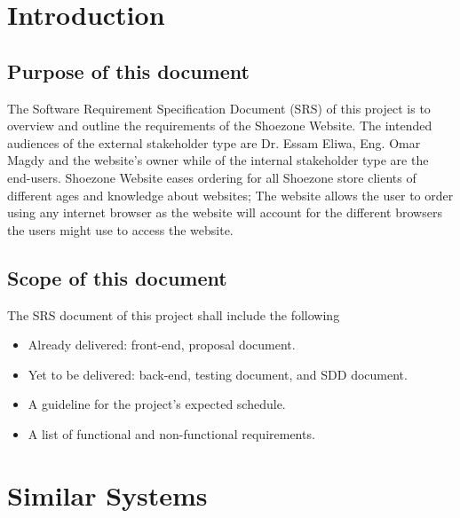 \documentclass[12pt]{article}
\begin{document}
\section{Introduction}
\subsection{Purpose of this document}
The Software Requirement Specification Document (SRS) of this project is to overview and outline the requirements of the Shoezone Website. The intended audiences of the external stakeholder type are Dr. Essam Eliwa, Eng. Omar Magdy and the website's owner while of the internal stakeholder type are the end-users. Shoezone Website eases ordering for all Shoezone store clients of different ages and knowledge about websites; The website allows the user to order using any internet browser as the website will account for the different browsers the users might use to access the website.
\subsection{Scope of this document}
The SRS document of this project shall include the following
\begin{itemize}
\item Already delivered: front-end, proposal document.
\item Yet to be delivered: back-end, testing document, and SDD document.
\item A guideline for the project's expected schedule.
\item A list of functional and non-functional requirements.
\end{itemize}





\section{Similar Systems}
\end{document}
